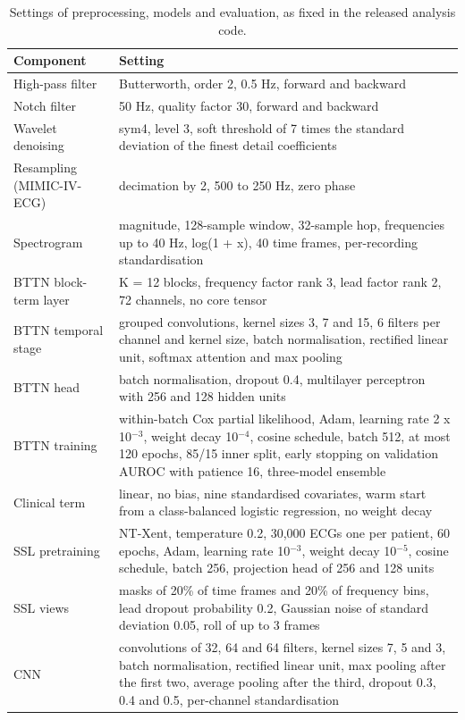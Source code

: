 \documentclass[preprint,12pt]{elsarticle}
\begin{document}
\renewcommand{\thetable}{S1}
\begin{table}[htbp]
\centering
\small
\caption{Settings of preprocessing, models and evaluation, as fixed in the released analysis code.}
\label{tab:S1}
\begin{tabularx}{\textwidth}{@{}L{0.25\textwidth}Y@{}}
\toprule
Component & Setting \\
\midrule
High-pass filter & Butterworth, order 2, 0.5 Hz, forward and backward \\
Notch filter & 50 Hz, quality factor 30, forward and backward \\
Wavelet denoising & sym4, level 3, soft threshold of 7 times the standard deviation of the finest detail coefficients \\
Resampling (MIMIC-IV-ECG) & decimation by 2, 500 to 250 Hz, zero phase \\
Spectrogram & magnitude, 128-sample window, 32-sample hop, frequencies up to 40 Hz, log(1 + x), 40 time frames, per-recording standardisation \\
BTTN block-term layer & K = 12 blocks, frequency factor rank 3, lead factor rank 2, 72 channels, no core tensor \\
BTTN temporal stage & grouped convolutions, kernel sizes 3, 7 and 15, 6 filters per channel and kernel size, batch normalisation, rectified linear unit, softmax attention and max pooling \\
BTTN head & batch normalisation, dropout 0.4, multilayer perceptron with 256 and 128 hidden units \\
BTTN training & within-batch Cox partial likelihood, Adam, learning rate 2 x 10$^{-3}$, weight decay 10$^{-4}$, cosine schedule, batch 512, at most 120 epochs, 85/15 inner split, early stopping on validation AUROC with patience 16, three-model ensemble \\
Clinical term & linear, no bias, nine standardised covariates, warm start from a class-balanced logistic regression, no weight decay \\
SSL pretraining & NT-Xent, temperature 0.2, 30,000 ECGs one per patient, 60 epochs, Adam, learning rate 10$^{-3}$, weight decay 10$^{-5}$, cosine schedule, batch 256, projection head of 256 and 128 units \\
SSL views & masks of 20\% of time frames and 20\% of frequency bins, lead dropout probability 0.2, Gaussian noise of standard deviation 0.05, roll of up to 3 frames \\
CNN & convolutions of 32, 64 and 64 filters, kernel sizes 7, 5 and 3, batch normalisation, rectified linear unit, max pooling after the first two, average pooling after the third, dropout 0.3, 0.4 and 0.5, per-channel standardisation \\

\end{tabularx}
\end{table}
\end{document}
